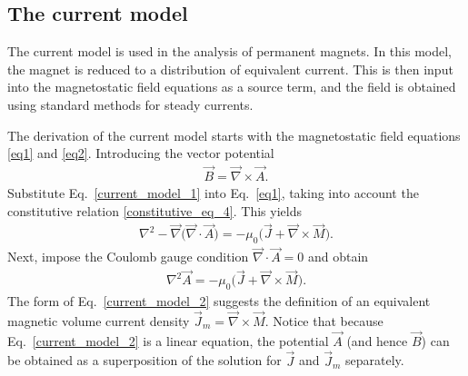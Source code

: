 \documentclass[12pt,a4paper,oneside]{book}
\begin{document}
\begin{onehalfspace}
\section{The current model}
The current model is used in the analysis of permanent magnets. In this model, the magnet is reduced to a distribution of equivalent current. This is then input into the magnetostatic field equations as a source term, and the field is obtained using standard methods for steady currents. 

The derivation of the current model starts with the magnetostatic field equations \ref{eq1} and \ref{eq2}. Introducing the vector potential     
\begin{equation}\label{current_model_1}
	\begin{aligned}
		\vec{B} = \vec{\nabla}\times\vec{A}.
	\end{aligned}
\end{equation}
Substitute Eq.~\eqref{current_model_1} into Eq.~\eqref{eq1}, taking into account the constitutive relation \ref{constitutive_eq_4}. This yields
\begin{equation*}\label{}
	\begin{aligned}
		\nabla^2-\vec{\nabla}\Big(\vec{\nabla}\cdot\vec{A}\Big)=-\mu_0\Big(\vec{J}+\vec{\nabla}\times\vec{M}\Big).
	\end{aligned}
\end{equation*}
Next, impose the Coulomb gauge condition $\vec{\nabla}\cdot\vec{A}=0$ and obtain
\begin{equation}\label{current_model_2}
	\begin{aligned}
		\nabla^2 \vec{A}= -\mu_0\Big(\vec{J}+\vec{\nabla}\times\vec{M}\Big).
	\end{aligned}
\end{equation}
The form of Eq.~\eqref{current_model_2} suggests the definition of an equivalent magnetic volume current density $\vec{J}_m=\vec{\nabla}\times\vec{M}$. Notice that because Eq.~\eqref{current_model_2} is a linear equation, the potential $\vec{A}$ (and hence $\vec{B}$) can be obtained as a superposition of the solution for $\vec{J}$ and $\vec{J}_m$ separately.


\end{onehalfspace}
\end{document}
